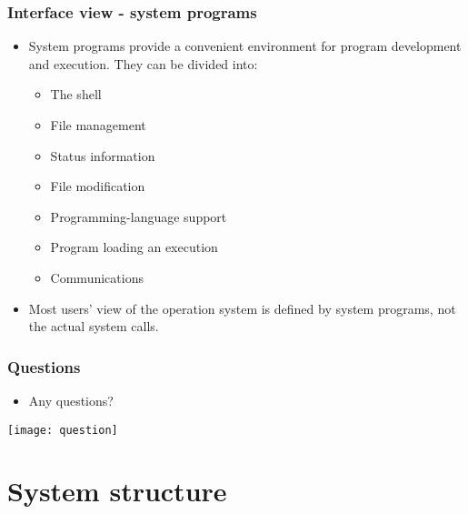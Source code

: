 \documentclass[CJKutf8,dvipsnames,table]{beamer}
\begin{document}
\begin{CJK*}{UTF8}{song}
  \begin{frame}
    \frametitle{Interface view - system programs} \pause
    \begin{itemize}
    \item System programs provide a convenient environment for program development and execution. They can be divided into:  \pause
      \begin{itemize}
      \item The shell  \pause
      \item File management  \pause
      \item Status information  \pause
      \item File modification  \pause
      \item Programming-language support  \pause
      \item Program loading an execution  \pause
      \item Communications  \pause
      \end{itemize}
    \item Most users' view of the operation system is defined by system programs, not the actual system calls. 
    \end{itemize}
  \end{frame}

  \begin{frame}
    \frametitle{Questions}
    \begin{itemize}
    \item Any questions? 
    \end{itemize}
    \begin{center}
      \texttt{[image: question]}
    \end{center}
  \end{frame}

  \section{System structure}
  \fi



\end{CJK*}
\end{document}
